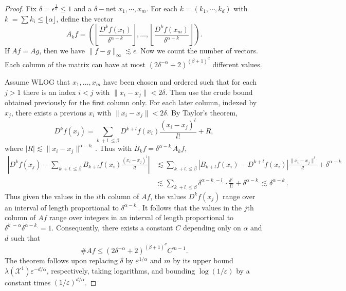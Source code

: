 \begin{proof}
    Fix $\delta = \epsilon^{\frac 1 \alpha} \le 1$ and a $\delta-$net $x_1, \cdots,x_m$. For each $k=(k_1,\cdots, k_d)$ with $k_{\cdot}=\sum k_i \le \lfloor\alpha\rfloor$, define the vector
    \[
    A_k f = \left( \left\lfloor \frac{D^k f(x_1)}{\delta^{\alpha-k}} \right\rfloor, \ldots, \left\lfloor \frac{D^k f(x_m)}{\delta^{\alpha-k}} \right\rfloor \right).
    \]
    If $Af=Ag$, then we have $\|f-g\|_\infty \lesssim \epsilon$. Now we count the number of vectors. Each column of the matrix can have at most $(2\delta^{-\alpha}+2)^{(\beta+1)^d}$ different values.
    
    Assume WLOG that $x_1, \ldots, x_m$ have been chosen and ordered such that for each $j > 1$ there is an index $i < j$ with $\|x_i - x_j\| < 2\delta$. Then use the crude bound obtained previously for the first column only. For each later column, indexed by $x_j$, there exists a previous $x_i$ with $\|x_i - x_j\| < 2\delta$. By Taylor's theorem,
    \[
    D^k f(x_j) = \sum_{k_\cdot + l_\cdot \leq \beta} D^{k+l} f(x_i) \frac{(x_i - x_j)^l}{l!} + R,
    \]
    where $|R| \lesssim \|x_i - x_j\|^{\alpha - k_\cdot}$. Thus with $B_k f = \delta^{\alpha - k_\cdot} A_k f$,
    \begin{align*}
    \left| D^k f(x_j) - \sum_{k_\cdot + l_\cdot \leq \beta} B_{k+l} f(x_i) \frac{(x_i - x_j)^l}{l!} \right|
    &\lesssim \sum_{k_\cdot + l_\cdot \leq \beta} \left| B_{k+l} f(x_i) - D^{k+l} f(x_i) \right| \frac{\|x_i - x_j\|^l}{l!} + \delta^{\alpha - k_\cdot} \\
    &\lesssim \sum_{k_\cdot + l_\cdot \leq \beta} \delta^{\alpha - k_\cdot - l_\cdot} \cdot \frac{\delta^{l_\cdot}}{l!} + \delta^{\alpha - k_\cdot} \lesssim \delta^{\alpha - k_\cdot}.
    \end{align*}
    Thus given the values in the $i$th column of $Af$, the values $D^k f(x_j)$ range over an interval of length proportional to $\delta^{\alpha - k_\cdot}$. It follows that the values in the $j$th column of $Af$ range over integers in an interval of length proportional to $\delta^{k_\cdot - \alpha} \delta^{\alpha - k_\cdot} = 1$. Consequently, there exists a constant $C$ depending only on $\alpha$ and $d$ such that
    \[
    \#Af \leq (2\delta^{-\alpha} + 2)^{(\beta+1)^d} C^{m-1}.
    \]
    The theorem follows upon replacing $\delta$ by $\varepsilon^{1/\alpha}$ and $m$ by its upper bound $\lambda(\mathcal{X}^1) \varepsilon^{-d/\alpha}$, respectively, taking logarithms, and bounding $\log(1/\varepsilon)$ by a constant times $(1/\varepsilon)^{d/\alpha}$.
\end{proof}

